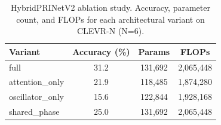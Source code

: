 \begin{table}[t]
\centering
\caption{HybridPRINetV2 ablation study. Accuracy, parameter count, and FLOPs for each architectural variant on CLEVR-N (N=6).}
\label{tab:ablation}
\begin{tabular}{lccc}
\toprule
Variant & Accuracy (\%) & Params & FLOPs \\
\midrule
full & 31.2 & 131,692 & 2,065,448 \\
attention\_only & 21.9 & 118,485 & 1,874,280 \\
oscillator\_only & 15.6 & 122,844 & 1,928,168 \\
shared\_phase & 25.0 & 131,692 & 2,065,448 \\
\bottomrule
\end{tabular}
\end{table}